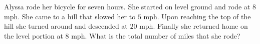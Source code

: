 Alyssa rode her bicycle for seven hours. She started on level ground and rode at $8$ mph. She came to a hill that slowed her to $5$ mph. Upon reaching the top of the hill she turned around and descended at $20$ mph. Finally she returned home on the level portion at $8$ mph. What is the total number of miles that she rode?
